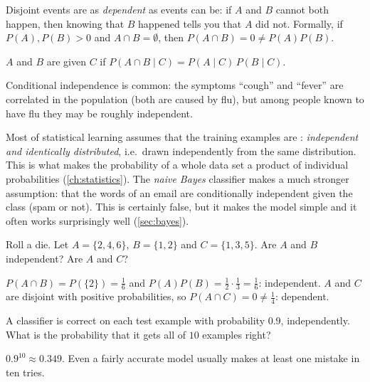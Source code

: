\begin{pitfall}
Disjoint events are as \emph{dependent} as events can be: if $A$ and $B$ cannot
both happen, then knowing that $B$ happened tells you that $A$ did not. Formally,
if $P(A), P(B) > 0$ and $A \cap B = \emptyset$, then $P(A \cap B) = 0 \neq
P(A)P(B)$.
\end{pitfall}

\begin{definition}\label{def:conditional-independence}
$A$ and $B$ are  given $C$ if
$P(A \cap B \mid C) = P(A \mid C)\,P(B \mid C)$.
\end{definition}

Conditional independence is common: the symptoms ``cough'' and ``fever'' are
correlated in the population (both are caused by flu), but among people known to
have flu they may be roughly independent.

\begin{mlnote}
Most of statistical learning assumes that the training examples are
: \emph{independent and identically distributed}, i.e.\ drawn
independently from the same distribution. This is what makes the probability of
a whole data set a product of individual probabilities (\cref{ch:statistics}).
The \emph{naive Bayes} classifier makes a much stronger assumption: that the
words of an email are conditionally independent given the class (spam or not).
This is certainly false, but it makes the model simple and it often works
surprisingly well (\cref{sec:bayes}).
\end{mlnote}

\sectionexercises

\begin{exercise}
Roll a die. Let $A = \{2, 4, 6\}$, $B = \{1, 2\}$ and $C = \{1, 3, 5\}$. Are $A$
and $B$ independent? Are $A$ and $C$?
\end{exercise}
\begin{solution}
$P(A \cap B) = P(\{2\}) = \tfrac16$ and $P(A)P(B) = \tfrac12\cdot\tfrac13 =
\tfrac16$: independent. $A$ and $C$ are disjoint with positive probabilities, so
$P(A \cap C) = 0 \neq \tfrac14$: dependent.
\end{solution}

\begin{exercise}
A classifier is correct on each test example with probability $0.9$,
independently. What is the probability that it gets all of $10$ examples right?
\end{exercise}
\begin{solution}
$0.9^{10} \approx 0.349$. Even a fairly accurate model usually makes at least one
mistake in ten tries.
\end{solution}

